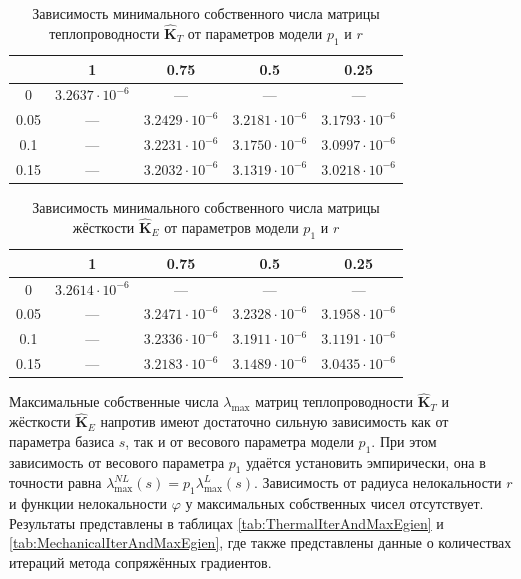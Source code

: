\begin{table}[htbp]
    \centering
    \begin{threeparttable}%
        \caption{Зависимость минимального собственного числа матрицы теплопроводности $\widehat{\textbf{K}}_T$ от параметров модели $p_1$ и $r$}\label{tab:ThermalEigenMin}
        \begin{tabular}{|c|c|c|c|c|}
			\hline
			\backslashbox{$r$}{$p_1$} & 1 & 0.75 & 0.5 & 0.25 \\
			\hline
			0    & $3.2637 \cdot 10^{-6}$ & --- & --- & --- \\
			\hline
			0.05 & --- & $3.2429 \cdot 10^{-6}$ & $3.2181 \cdot 10^{-6}$ & $3.1793 \cdot 10^{-6}$ \\
			\hline
			0.1  & --- & $3.2231 \cdot 10^{-6}$ & $3.1750 \cdot 10^{-6}$ & $3.0997 \cdot 10^{-6}$ \\
			\hline
			0.15 & --- & $3.2032 \cdot 10^{-6}$ & $3.1319 \cdot 10^{-6}$ & $3.0218 \cdot 10^{-6}$ \\
			\hline
        \end{tabular}
    \end{threeparttable}
\end{table}

\begin{table}[htbp]
    \centering
    \begin{threeparttable}%
        \caption{Зависимость минимального собственного числа матрицы жёсткости $\widehat{\textbf{K}}_E$ от параметров модели $p_1$ и $r$}\label{tab:StressEigenMin}
        \begin{tabular}{|c|c|c|c|c|}
			\hline
			\backslashbox{$r$}{$p_1$} & 1 & 0.75 & 0.5 & 0.25 \\
			\hline
			0    & $3.2614 \cdot 10^{-6}$ & --- & --- & --- \\
			\hline
			0.05 & --- & $3.2471 \cdot 10^{-6}$ & $3.2328 \cdot 10^{-6}$ & $3.1958 \cdot 10^{-6}$ \\
			\hline
			0.1  & --- & $3.2336 \cdot 10^{-6}$ & $3.1911 \cdot 10^{-6}$ & $3.1191 \cdot 10^{-6}$ \\
			\hline
			0.15 & --- & $3.2183 \cdot 10^{-6}$ & $3.1489 \cdot 10^{-6}$ & $3.0435 \cdot 10^{-6}$ \\
			\hline
        \end{tabular}
    \end{threeparttable}
\end{table}

Максимальные собственные числа $\lambda_{\max}$ матриц теплопроводности $\widehat{\textbf{K}}_T$ и жёсткости $\widehat{\textbf{K}}_E$ напротив имеют достаточно сильную зависимость как от параметра базиса $s$, так и от весового параметра модели $p_1$. При этом зависимость от весового параметра $p_1$ удаётся установить эмпирически, она в точности равна $\lambda_{\max}^{NL}(s) = p_1 \lambda_{\max}^{L}(s)$. Зависимость от радиуса нелокальности $r$ и функции нелокальности $\varphi$ у максимальных собственных чисел отсутствует. Результаты представлены в таблицах \ref{tab:ThermalIterAndMaxEgien} и \ref{tab:MechanicalIterAndMaxEgien}, где также представлены данные о количествах итераций метода сопряжённых градиентов.

